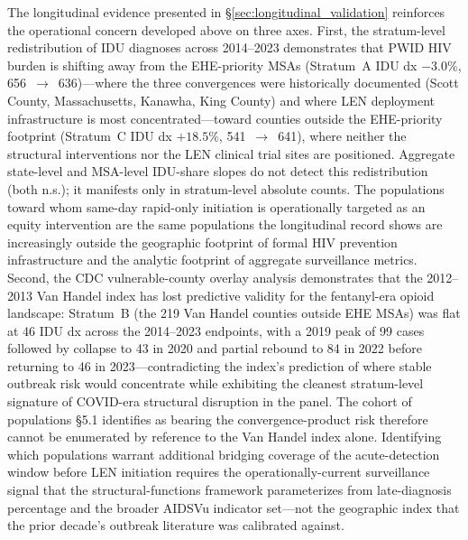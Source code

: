 \documentclass[12pt]{article}
\begin{document}
The longitudinal evidence presented in §\ref{sec:longitudinal_validation} reinforces the operational concern developed above on three axes. 
First, the stratum-level redistribution of IDU diagnoses across 2014--2023 demonstrates that PWID HIV burden is shifting away from the EHE-priority MSAs (Stratum~A IDU dx $-3.0\%$, 656~$\to$~636)---where the three convergences were historically documented (Scott County, Massachusetts, Kanawha, King County) and where LEN deployment infrastructure is most concentrated---toward counties outside the EHE-priority footprint (Stratum~C IDU dx $+18.5\%$, 541~$\to$~641), where neither the structural interventions nor the LEN clinical trial sites are positioned. Aggregate state-level and MSA-level IDU-share slopes do not detect this redistribution (both n.s.); it manifests only in stratum-level absolute counts. The populations toward whom same-day rapid-only initiation is operationally targeted as an equity intervention are the same populations the longitudinal record shows are increasingly outside the geographic footprint of formal HIV prevention infrastructure and the analytic footprint of aggregate surveillance metrics. 
Second, the CDC vulnerable-county overlay analysis demonstrates that the 2012--2013 Van Handel index has lost predictive validity for the fentanyl-era opioid landscape: Stratum~B (the 219 Van Handel counties outside EHE MSAs) was flat at 46 IDU dx across the 2014--2023 endpoints, with a 2019 peak of 99 cases followed by collapse to 43 in 2020 and partial rebound to 84 in 2022 before returning to 46 in 2023---contradicting the index's prediction of where stable outbreak risk would concentrate while exhibiting the cleanest stratum-level signature of COVID-era structural disruption in the panel. The cohort of populations §5.1 identifies as bearing the convergence-product risk therefore cannot be enumerated by reference to the Van Handel index alone. Identifying which populations warrant additional bridging coverage of the acute-detection window before LEN initiation requires the operationally-current surveillance signal that the structural-functions framework parameterizes from late-diagnosis percentage and the broader AIDSVu indicator set---not the geographic index that the prior decade's outbreak literature was calibrated against.  
\end{document}
